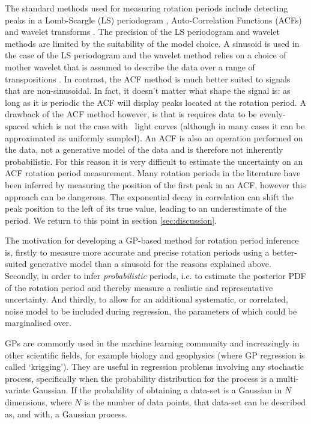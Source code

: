 The standard methods used for measuring rotation periods include detecting
peaks in a Lomb-Scargle (LS) periodogram \citep[e.g.][]{Reinhold2013},
Auto-Correlation Functions (ACFs) \citep{Mcquillan2013} and wavelet transforms
\citep{Garcia2014}.
The precision of the LS periodogram and wavelet methods are limited by the
suitability of the model choice.
A sinusoid is used in the case of the LS periodogram and the wavelet method
relies on a choice of mother wavelet that is assumed to describe the data over
a range of transpositions \citep[see, \eg][]{Carter2010}.
In contrast, the ACF method is much better suited to signals that are
non-sinusoidal.
In fact, it doesn't matter what shape the signal is: as long as it is periodic
the ACF will display peaks located at the rotation period.
A drawback of the ACF method however, is that is requires data to be
evenly-spaced which is not the case with \Kepler\ light curves (although in
many cases it can be approximated as uniformly sampled).
An ACF is also an operation performed on the data, not a generative model of
the data and is therefore not inherently probabilistic.
For this reason it is very difficult to estimate the uncertainty on an ACF
rotation period measurement.
Many rotation periods in the literature have been inferred by measuring the
position of the first peak in an ACF, however this approach can be dangerous.
The exponential decay in correlation can shift the peak position to the left
of its true value, leading to an underestimate of the period.
We return to this point in section \textsection \ref{sec:discussion}.

The motivation for developing a GP-based method for rotation period inference
is, firstly to measure more accurate and precise rotation periods using a
better-suited generative model than a sinusoid for the reasons explained
above.
Secondly, in order to infer {\it probabilistic} periods, i.e. to estimate the
posterior PDF of the rotation period and thereby measure a realistic and
representative uncertainty.
And thirdly, to allow for an additional systematic, or correlated, noise model
to be included during regression, the parameters of which could be
marginalised over.

GPs are commonly used in the machine learning community and increasingly
in other scientific fields, for example biology and geophysics (where GP
regression is called `krigging').
They are useful in regression problems involving any stochastic process,
specifically when the probability distribution for the process is a
multi-variate Gaussian.
If the probability of obtaining a data-set is a Gaussian in $N$ dimensions,
where $N$ is the number of data points, that data-set can be described as, and
with, a Gaussian process.

